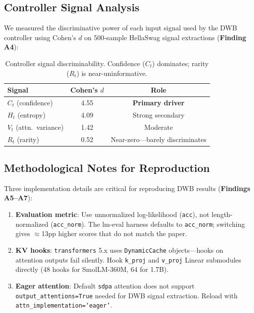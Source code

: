 \documentclass{article}
\begin{document}
\subsection{Controller Signal Analysis}

We measured the discriminative power of each input signal used by the DWB controller using Cohen's $d$ on 500-sample HellaSwag signal extractions (\textbf{Finding A4}):

\begin{table}[h]
\centering
\caption{Controller signal discriminability. Confidence ($C_t$) dominates; rarity ($R_t$) is near-uninformative.}
\begin{tabular}{lcc}
\toprule
Signal & Cohen's $d$ & Role \\
\midrule
$C_t$ (confidence) & 4.55 & \textbf{Primary driver} \\
$H_t$ (entropy) & 4.09 & Strong secondary \\
$V_t$ (attn.\ variance) & 1.42 & Moderate \\
$R_t$ (rarity) & 0.52 & Near-zero---barely discriminates \\
\bottomrule
\end{tabular}
\end{table}

\subsection{Methodological Notes for Reproduction}

Three implementation details are critical for reproducing DWB results (\textbf{Findings A5--A7}):

\begin{enumerate}
\item \textbf{Evaluation metric}: Use unnormalized log-likelihood (\texttt{acc}), not length-normalized (\texttt{acc\_norm}). The lm-eval harness defaults to \texttt{acc\_norm}; switching gives $\approx$13pp higher scores that do not match the paper.

\item \textbf{KV hooks}: \texttt{transformers} 5.x uses \texttt{DynamicCache} objects---hooks on attention outputs fail silently. Hook \texttt{k\_proj} and \texttt{v\_proj} Linear submodules directly (48 hooks for SmolLM-360M, 64 for 1.7B).

\item \textbf{Eager attention}: Default \texttt{sdpa} attention does not support \texttt{output\_attentions=True} needed for DWB signal extraction. Reload with \texttt{attn\_implementation=`eager'}.
\end{enumerate}
\end{document}
